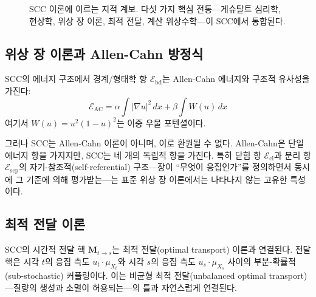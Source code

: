 \begin{figure}[t]
\centering
{}
\caption{SCC 이론에 이르는 지적 계보. 다섯 가지 핵심 전통---게슈탈트 심리학, 현상학, 위상 장 이론, 최적 전달, 계산 위상수학---이 SCC에서 통합된다.}
\label{fig:intellectual-timeline}
\end{figure}


\subsection{위상 장 이론과 Allen-Cahn 방정식}

SCC의 에너지 구조에서 경계/형태학 항 $\mathcal{E}_{\mathrm{bd}}$는 Allen-Cahn 에너지와 구조적 유사성을 가진다:
\begin{equation}
    \mathcal{E}_{\mathrm{AC}} = \alpha \int |\nabla u|^2\, dx + \beta \int W(u)\, dx
    \label{eq:allen-cahn}
\end{equation}
여기서 $W(u) = u^2(1-u)^2$는 이중 우물 포텐셜이다.

그러나 SCC는 Allen-Cahn 이론이 아니며, 이로 환원될 수 없다. Allen-Cahn은 단일 에너지 항을 가지지만, SCC는 네 개의 독립적 항을 가진다. 특히 닫힘 항 $\mathcal{E}_{\mathrm{cl}}$과 분리 항 $\mathcal{E}_{\mathrm{sep}}$의 자기-참조적(self-referential) 구조---장이 ``무엇이 응집인가''를 정의하면서 동시에 그 기준에 의해 평가받는---는 표준 위상 장 이론에서는 나타나지 않는 고유한 특성이다.


\subsection{최적 전달 이론}

SCC의 시간적 전달 핵 $\mathbf{M}_{t \to s}$는 최적 전달(optimal transport) 이론과 연결된다. 전달 핵은 시각 $t$의 응집 측도 $u_t \cdot \mu_{X_t}$와 시각 $s$의 응집 측도 $u_s \cdot \mu_{X_s}$ 사이의 부분-확률적(sub-stochastic) 커플링이다. 이는 비균형 최적 전달(unbalanced optimal transport)---질량의 생성과 소멸이 허용되는---의 틀과 자연스럽게 연결된다.

